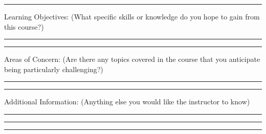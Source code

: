 \documentclass[11pt]{article}
\begin{document}
	\noindent\rule{\textwidth}{0.4pt}
	
	\noindent Learning Objectives: (What specific skills or knowledge do you hope to gain from this course?)
	
	\noindent\rule{\textwidth}{0.4pt}
	
	\noindent\rule{\textwidth}{0.4pt}
	
	\noindent Areas of Concern: (Are there any topics covered in the course that you anticipate being particularly challenging?)
	
	\noindent\rule{\textwidth}{0.4pt}
	
	\noindent\rule{\textwidth}{0.4pt}
	
	\noindent Additional Information: (Anything else you would like the instructor to know)
	
	\noindent\rule{\textwidth}{0.4pt}
	
	\noindent\rule{\textwidth}{0.4pt}
	
	\noindent\rule{\textwidth}{0.4pt}

	
\end{document}
